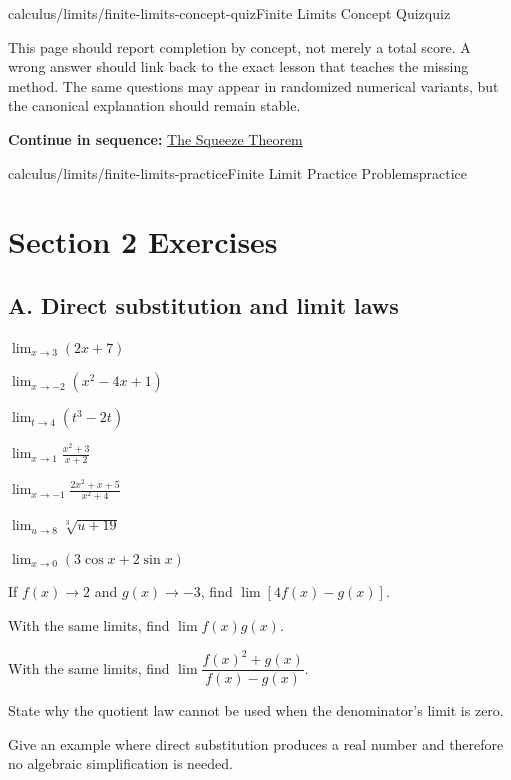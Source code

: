 \documentclass[11pt,openany]{book}
\theoremstyle{bgplain}
\newcommand{\webnext}[2]{%
  \par\addvspace{1.2em}\noindent{\color{BGLine}\rule{\textwidth}{0.35pt}}\par\smallskip
  {\small\color{BGGray}\textbf{Continue in sequence:} \hyperlink{web:#1}{#2}}\par
}
\begin{document}
\begin{webpage}{calculus/limits/finite-limits-concept-quiz}{Finite Limits Concept Quiz}{quiz}
\begin{bgsummary}[title={Quiz use on the website}]
This page should report completion by concept, not merely a total score. A wrong answer should link back to the exact lesson that teaches the missing method. The same questions may appear in randomized numerical variants, but the canonical explanation should remain stable.
\end{bgsummary}
\webnext{calculus/limits/squeeze-theorem}{The Squeeze Theorem}
\end{webpage}

\begin{webpage}{calculus/limits/finite-limits-practice}{Finite Limit Practice Problems}{practice}
\section*{Section 2 Exercises}

\subsection*{A. Direct substitution and limit laws}
\begin{bgexercises}[label=\textbf{2.\arabic*}]
  \item \(\displaystyle\lim_{x\to3}(2x+7)\)
  \item \(\displaystyle\lim_{x\to-2}(x^2-4x+1)\)
  \item \(\displaystyle\lim_{t\to4}(t^3-2t)\)
  \item \(\displaystyle\lim_{x\to1}\frac{x^2+3}{x+2}\)
  \item \(\displaystyle\lim_{x\to-1}\frac{2x^2+x+5}{x^2+4}\)
  \item \(\displaystyle\lim_{u\to8}\sqrt[3]{u+19}\)
  \item \(\displaystyle\lim_{x\to0}(3\cos x+2\sin x)\)
  \item If \(f(x)\to2\) and \(g(x)\to-3\), find \(\lim[4f(x)-g(x)]\).
  \item With the same limits, find \(\lim f(x)g(x)\).
  \item With the same limits, find \(\lim\dfrac{f(x)^2+g(x)}{f(x)-g(x)}\).
  \item State why the quotient law cannot be used when the denominator's limit is zero.
  \item Give an example where direct substitution produces a real number and therefore no algebraic simplification is needed.
\end{bgexercises}


\end{webpage}
\end{document}
